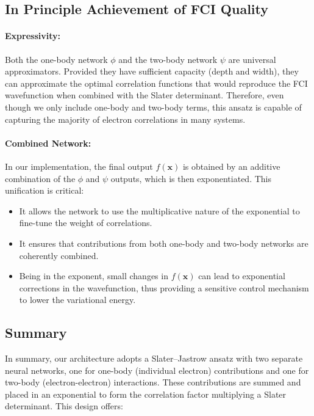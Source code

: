 \subsection{In Principle Achievement of FCI Quality}

\paragraph{Expressivity:}  
Both the one-body network \(\phi\) and the two-body network \(\psi\) are universal approximators. Provided they have sufficient capacity (depth and width), they can approximate the optimal correlation functions that would reproduce the FCI wavefunction when combined with the Slater determinant. Therefore, even though we only include one-body and two-body terms, this ansatz is capable of capturing the majority of electron correlations in many systems.

\paragraph{Combined Network:}  
In our implementation, the final output \(f(\mathbf{x})\) is obtained by an additive combination of the \(\phi\) and \(\psi\) outputs, which is then exponentiated. This unification is critical:
\begin{itemize}
  \item It allows the network to use the multiplicative nature of the exponential to fine-tune the weight of correlations.
  \item It ensures that contributions from both one-body and two-body networks are coherently combined.
  \item Being in the exponent, small changes in \(f(\mathbf{x})\) can lead to exponential corrections in the wavefunction, thus providing a sensitive control mechanism to lower the variational energy.
\end{itemize}

\subsection{Summary}

In summary, our architecture adopts a Slater–Jastrow ansatz with two separate neural networks, one for one-body (individual electron) contributions and one for two-body (electron-electron) interactions. These contributions are summed and placed in an exponential to form the correlation factor multiplying a Slater determinant. This design offers:

